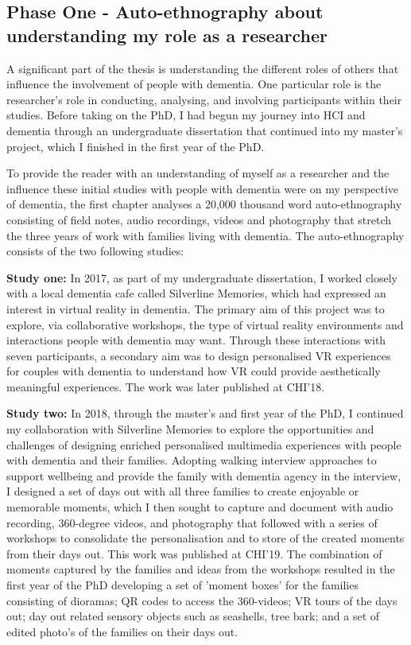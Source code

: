 \subsection{Phase One - Auto-ethnography about understanding my role as a researcher}

A significant part of the thesis is understanding the different roles of others that influence the involvement of people with dementia. One particular role is the researcher's role in conducting, analysing, and involving participants within their studies. Before taking on the PhD, I had begun my journey into HCI and dementia through an undergraduate dissertation that continued into my master's project, which I finished in the first year of the PhD. 

To provide the reader with an understanding of myself as a researcher and the influence these initial studies with people with dementia were on my perspective of dementia, the first chapter analyses a 20,000 thousand word auto-ethnography consisting of field notes, audio recordings, videos and photography that stretch the three years of work with families living with dementia. The auto-ethnography consists of the two following studies:

\textbf{Study one:} In 2017, as part of my undergraduate dissertation, I worked closely with a local dementia cafe called Silverline Memories, which had expressed an interest in virtual reality in dementia. The primary aim of this project was to explore, via collaborative workshops, the type of virtual reality environments and interactions people with dementia may want. Through these interactions with seven participants, a secondary aim was to design personalised VR experiences for couples with dementia to understand how VR could provide aesthetically meaningful experiences. The work was later published at CHI'18. 

\textbf{Study two:} In 2018, through the master's and first year of the PhD, I continued my collaboration with Silverline Memories to explore the opportunities and challenges of designing enriched personalised multimedia experiences with people with dementia and their families. Adopting walking interview approaches to support wellbeing and provide the family with dementia agency in the interview, I designed a set of days out with all three families to create enjoyable or memorable moments, which I then sought to capture and document with audio recording, 360-degree videos, and photography that followed with a series of workshops to consolidate the personalisation and to store of the created moments from their days out. This work was published at CHI'19. The combination of moments captured by the families and ideas from the workshops resulted in the first year of the PhD developing a set of 'moment boxes' for the families consisting of dioramas; QR codes to access the 360-videos; VR tours of the days out; day out related sensory objects such as seashells, tree bark; and a set of edited photo's of the families on their days out. 

